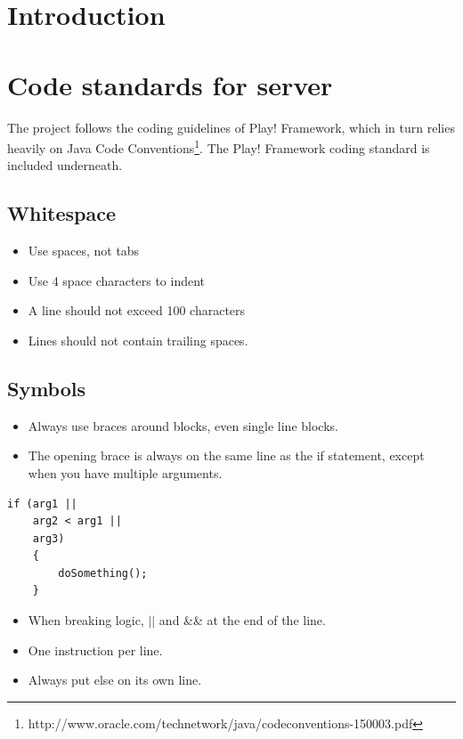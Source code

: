 \documentclass[11pt]{book}
\begin{document}
\section{Introduction}

\section{Code standards for server}\label{sec:codeStandard}
The project follows the coding guidelines of Play! Framework\cite{playCodingStandard}, which in turn relies heavily on Java Code Conventions\footnote{http://www.oracle.com/technetwork/java/codeconventions-150003.pdf}. The Play! Framework coding standard is included underneath.

\subsection{Whitespace}
\begin{itemize}
    \item Use spaces, not tabs
    \item Use 4 space characters to indent
    \item A line should not exceed 100 characters
    \item Lines should not contain trailing spaces.
\end{itemize}

\subsection{Symbols}
\begin{itemize}
    \item Always use braces around blocks, even single line blocks.
    \item The opening brace is always on the same line as the if statement, except when you have multiple arguments.
\end{itemize}
\lstset{language=Java}
\begin{lstlisting}[frame=single]
if (arg1 ||
    arg2 < arg1 ||
    arg3)
    {
        doSomething();
    }
\end{lstlisting}
\begin{itemize}
    \item When breaking logic, $||$ and \&\& at the end of the line.
    \item One instruction per line.
    \item Always put else on its own line.
\end{itemize}
\end{document}
